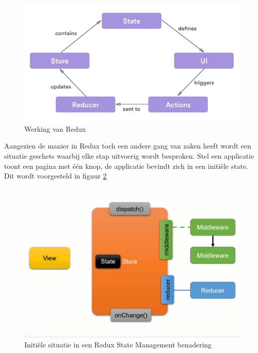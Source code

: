 \begin{figure}[H]
    \centering
    \includegraphics[width=\linewidth]{img/stand-van-zaken/redux-working.png}
    \caption{Werking van Redux \autocite{Tahir2018}}
    \label{fig:redux-working}
\end{figure}

Aangezien de manier in Redux toch een andere gang van zaken heeft wordt een situatie geschets waarbij elke stap uitvoerig wordt besproken.
Stel een applicatie toont een pagina met één knop, de applicatie bevindt zich in een initiële state. Dit wordt voorgesteld in figuur \ref{fig:redux-working-detailed-1}

\begin{figure}[H]
    \centering
    \includegraphics[width=\figureWidthModifier\linewidth]{img/stand-van-zaken/redux-working-detailed-1.png}
    \caption{Initiële situatie in een Redux State Management benadering}
    \label{fig:redux-working-detailed-1}
\end{figure}

